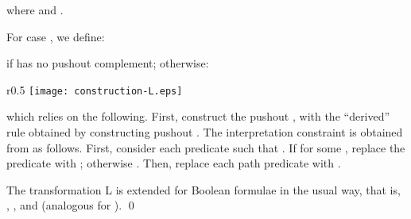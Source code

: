 \documentclass{llncs}
\begin{document}
	\noindent where  and .
	
	For case , we define:
		
	
	\noindent if  has no pushout complement; otherwise:

	


	
	\begin{wrapfigure}[6]{r}{0.5\textwidth}
		\centering
			\vspace{-2.5pt}
			\texttt{[image: construction-L.eps]}
	\end{wrapfigure}
	\noindent which relies on the following. First, construct the pushout , with  the ``derived'' rule obtained by constructing pushout . The interpretation constraint  is obtained from  as follows. First, consider each predicate  such that . If  for some , replace the predicate with ; otherwise . Then, replace each path predicate  with .
	
	The transformation L is extended for Boolean formulae in the usual way, that is, , , and  (analogous for ).	
	\qed
\end{document}
